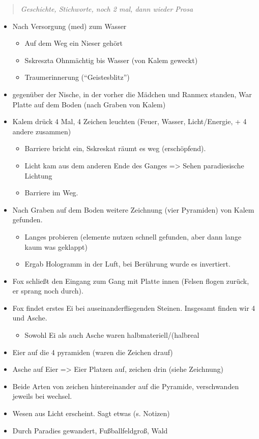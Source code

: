 \documentclass[11pt]{scrartcl}
\begin{document}
\begin{quote}
\emph{Geschichte, Stichworte, noch 2 mal, dann wieder Prosa}

\end{quote}
\begin{itemize}
\item
  Nach Versorgung (med) zum Wasser
  \begin{itemize}
  \item
    Auf dem Weg ein Nieser gehört
  \item
    Sskreszta Ohnmächtig bis Wasser (von Kalem geweckt)
  \item
    Traumerinnerung (``Geistesblitz'')
  \end{itemize}
\item
  gegenüber der Nische, in der vorher die Mädchen und Ranmex standen,
  War Platte auf dem Boden (nach Graben von Kalem)
\item
  Kalem drück 4 Mal, 4 Zeichen leuchten (Feuer, Wasser, Licht/Energie, +
  4 andere zusammen)

  \begin{itemize}
  \item
    Barriere bricht ein, Sskreskat räumt es weg (erschöpfend).
  \item
    Licht kam aus dem anderen Ende des Ganges =\textgreater{} Sehen
    paradiesische Lichtung
  \item
    Barriere im Weg.
  \end{itemize}
\item
  Nach Graben auf dem Boden weitere Zeichnung (vier Pyramiden) von Kalem
  gefunden.

  \begin{itemize}
  \item
    Langes probieren (elemente nutzen schnell gefunden, aber dann lange
    kaum was geklappt)
  \item
    Ergab Hologramm in der Luft, bei Berührung wurde es invertiert.
  \end{itemize}
\item
  Fox schließt den Eingang zum Gang mit Platte innen (Felsen flogen
  zurück, er sprang noch durch).
\item
  Fox findet erstes Ei bei auseinanderfliegenden Steinen. Insgesamt
  finden wir 4 und Asche.

  \begin{itemize}
  \item
    Sowohl Ei als auch Asche waren halbmateriell/(halbreal
  \end{itemize}
\item
  Eier auf die 4 pyramiden (waren die Zeichen drauf)
\item
  Asche auf Eier =\textgreater{} Eier Platzen auf, zeichen drin (siehe
  Zeichnung)
\item
  Beide Arten von zeichen hintereinander auf die Pyramide, verschwanden
  jeweils bei wechsel.
\item
  Wesen aus Licht erscheint. Sagt etwas (s. Notizen)
\item
  Durch Paradies gewandert, Fußballfeldgroß, Wald


\end{itemize}
\end{document}
